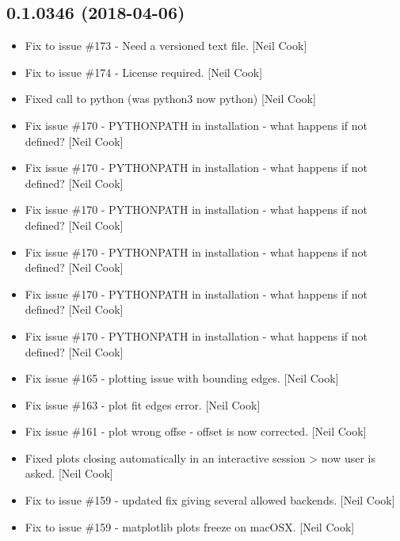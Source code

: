 \documentclass[a4paper,10pt,english]{report}
\begin{document}
\subsection{0.1.0346 (2018-04-06)}
\label{\detokenize{misc/changelog:id466}}\begin{itemize}
\item {} 
Fix to issue \#173 - Need a versioned text file. {[}Neil Cook{]}

\item {} 
Fix to issue \#174 - License required. {[}Neil Cook{]}

\item {} 
Fixed call to python (was python3 now python) {[}Neil Cook{]}

\item {} 
Fix issue \#170 - PYTHONPATH in installation - what happens if not
defined? {[}Neil Cook{]}

\item {} 
Fix issue \#170 - PYTHONPATH in installation - what happens if not
defined? {[}Neil Cook{]}

\item {} 
Fix issue \#170 - PYTHONPATH in installation - what happens if not
defined? {[}Neil Cook{]}

\item {} 
Fix issue \#170 - PYTHONPATH in installation - what happens if not
defined? {[}Neil Cook{]}

\item {} 
Fix issue \#170 - PYTHONPATH in installation - what happens if not
defined? {[}Neil Cook{]}

\item {} 
Fix issue \#170 - PYTHONPATH in installation - what happens if not
defined? {[}Neil Cook{]}

\item {} 
Fix issue \#165 -  plotting issue with bounding edges. {[}Neil
Cook{]}

\item {} 
Fix issue \#163 -  plot fit edges error. {[}Neil Cook{]}

\item {} 
Fix issue \#161 -  plot wrong offse - offset is now corrected.
{[}Neil Cook{]}

\item {} 
Fixed plots closing automatically in an interactive session \textendash{}\textgreater{} now
user is asked. {[}Neil Cook{]}

\item {} 
Fix to issue \#159 - updated fix giving several allowed backends. {[}Neil
Cook{]}

\item {} 
Fix to issue \#159 - matplotlib plots freeze on macOSX. {[}Neil Cook{]}

\end{itemize}
\end{document}
